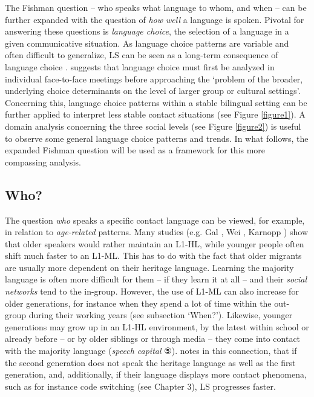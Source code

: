 \documentclass[output=paper,
modfonts
]{langscibook}
\begin{document}
The Fishman question -- who speaks what language to whom, and when -- can be further expanded with the question of \textit{how well} a language is spoken. Pivotal for answering these questions is \emph{language choice}, the selection of a language in a given communicative situation. As language choice patterns are variable and often difficult to generalize, LS can be seen as a long-term consequence of language choice \parencite[53]{Holmes2013}. \cite[68]{Fishman1965} suggests that language choice must first be analyzed in individual face-to-face meetings before approaching the ‘problem of the broader, underlying choice determinants on the level of larger group or cultural settings’. Concerning this, language choice patterns within a stable bilingual setting can be further applied to interpret less stable contact situations (see Figure \ref{figure1}). A domain analysis concerning the three social levels (see Figure \ref{figure2}) is useful to observe some general language choice patterns and trends. In what follows, the expanded Fishman question will be used as a framework for this more compassing analysis.

\subsection*{Who?}

The question \emph{who} speaks a specific contact language can be viewed, for example, in relation to \emph{age-related} patterns. Many studies (e.g. Gal \citeyear{Gal1979}, Wei \citeyear{Wei2002}, Karnopp \citeyear{Karnopp}) show that older speakers would rather maintain an L1-HL, while younger people often shift much faster to an L1-ML. This has to do with the fact that older migrants are usually more dependent on their heritage language. Learning the majority language is often more difficult for them -- if they learn it at all -- and their \emph{social networks} tend to the in-group. However, the use of L1-ML can also increase for older generations, for instance when they spend a lot of time within the out-group during their working years (see subsection ‘When?’). Likewise, younger generations may grow up in an L1-HL environment, by the latest within school or already before -- or by older siblings or through media -- they come into contact with the majority language (\emph{speech capital} ⑤). \cite[84-85]{Pauwels2016} notes in this connection, that if the second generation does not speak the heritage language as well as the first generation, and, additionally, if their language displays more contact phenomena, such as for instance code switching (see Chapter 3),
LS progresses faster. 
\end{document}
